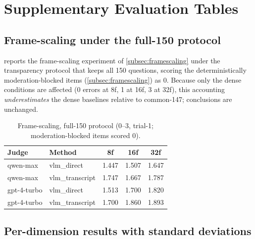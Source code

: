 
\chapter{Supplementary Evaluation Tables}
\label{app:tables}

\section{Frame-scaling under the full-150 protocol}
\label{app:full150}

 reports the frame-scaling experiment of
\cref{subsec:framescaling} under the transparency protocol that keeps all 150
questions, scoring the deterministically moderation-blocked items
(\cref{subsec:framescaling}) as 0. Because only the dense conditions are affected
(0 errors at 8f, 1 at 16f, 3 at 32f), this accounting \emph{underestimates} the
dense baselines relative to common-147; conclusions are unchanged.

\begin{table}[h]
  \centering
  \small
  \caption{Frame-scaling, full-150 protocol (0--3, trial-1; moderation-blocked
  items scored 0).}
  \label{tab:full150}
  \begin{tabular}{@{}llccc@{}}
    \toprule
    Judge & Method & 8f & 16f & 32f \\
    \midrule
    qwen-max & vlm\_direct & 1.447 & 1.507 & 1.647 \\
    qwen-max & vlm\_transcript & 1.747 & 1.667 & 1.787 \\
    gpt-4-turbo & vlm\_direct & 1.513 & 1.700 & 1.820 \\
    gpt-4-turbo & vlm\_transcript & 1.700 & 1.860 & 1.893 \\
    \bottomrule
  \end{tabular}
\end{table}

\section{Per-dimension results with standard deviations}
\label{app:l2full}

